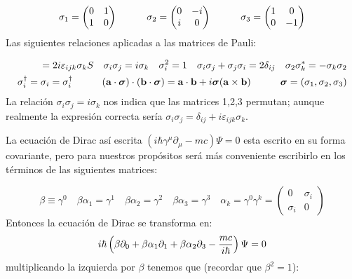 \begin{equation}
    \sigma_1 = \begin{pmatrix}
    0 & 1 \\
    1 & 0 \\ 
    \end{pmatrix} \quad \quad \quad 
    \sigma_2 = \begin{pmatrix}
    0 & -i \\
    i & 0 \\ 
    \end{pmatrix} \quad \quad \quad
    \sigma_3 = \begin{pmatrix}
    1 & 0 \\
    0 & -1 \\ 
    \end{pmatrix}
\end{equation}
Las siguientes relaciones aplicadas a las matrices de Pauli:

\begin{eqnarray}
    [\sigma_i,\sigma_j] = 2 i \varepsilon_{ijk} \sigma_kS \quad \sigma_i \sigma_j = i \sigma_k \quad \sigma_i^2 = 1 \quad \sigma_i \sigma_j + \sigma_j \sigma_i = 2 \delta_{ij} \quad \sigma_2 \sigma_k^* = - \sigma_k \sigma_2 \\
    \sigma_i^\dagger = \sigma_i = \sigma_i^\dagger \tquad (\an \cdot \sigman) \cdot (\bn \cdot \sigman) = \an \cdot \bn + i \sigman (\an \times \bn) \tquad \sigman = (\sigma_1,\sigma_2,\sigma_3) \label{Ec:01-02-15}
\end{eqnarray} 
La relación $\sigma_i \sigma_j = i \sigma_k$ nos indica que las matrices 1,2,3 permutan; aunque realmente la expresión correcta sería $\sigma_i \sigma_j = \delta_{ij} + i \varepsilon_{ijk} \sigma_k$. 

La ecuación de Dirac así escrita $(i\hbar \gamma^\mu \partial_\mu - mc)\Psi = 0$ esta escrito en su forma covariante, pero para nuestros propósitos será más conveniente escribirlo en los términos de las siguientes matrices:

\begin{equation}
    \beta \equiv \gamma^0 \quad \beta \alpha_1 = \gamma^1 \quad \beta \alpha_2 = \gamma^2 \quad \beta \alpha_3 = \gamma^3 \quad \alpha_k = \gamma^0 \gamma^k = \begin{pmatrix} 0 & \sigma_i \\ \sigma_i & 0 \end{pmatrix}
\end{equation}
Entonces la ecuación de Dirac se transforma en:
\begin{equation}
    i \hbar \left( \beta \partial_0 + \beta \alpha_1 \partial_1 + \beta \alpha_2 \partial_3 - \frac{mc}{i \hbar} \right) \Psi = 0
\end{equation}
multiplicando la izquierda por $\beta$ tenemos que (recordar que $\beta^2 = 1$):

